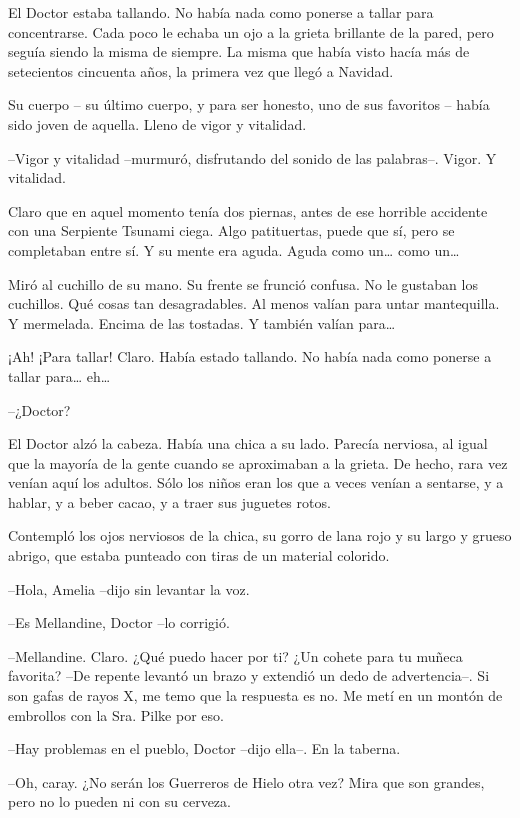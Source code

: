 El Doctor estaba tallando. No había nada como ponerse a tallar para concentrarse. Cada poco le echaba un ojo a la grieta brillante de la pared, pero seguía siendo la misma de siempre. La misma que había visto hacía más de setecientos cincuenta años, la primera vez que llegó a Navidad.

Su cuerpo – su último cuerpo, y para ser honesto, uno de sus favoritos – había sido joven de aquella. Lleno de vigor y vitalidad.

--Vigor y vitalidad --murmuró, disfrutando del sonido de las palabras--. Vigor. Y vitalidad.

Claro que en aquel momento tenía dos piernas, antes de ese horrible accidente con una Serpiente Tsunami ciega. Algo patituertas, puede que sí, pero se completaban entre sí. Y su mente era aguda. Aguda como un… como un…

Miró al cuchillo de su mano. Su frente se frunció confusa. No le gustaban los cuchillos. Qué cosas tan desagradables. Al menos valían para untar mantequilla. Y mermelada. Encima de las tostadas. Y también valían para…

¡Ah! ¡Para tallar! Claro. Había estado tallando. No había nada como ponerse a tallar para… eh…

--¿Doctor?

El Doctor alzó la cabeza. Había una chica a su lado. Parecía nerviosa, al igual que la mayoría de la gente cuando se aproximaban a la grieta. De hecho, rara vez venían aquí los adultos. Sólo los niños eran los que a veces venían a sentarse, y a hablar, y a beber cacao, y a traer sus juguetes rotos.

Contempló los ojos nerviosos de la chica, su gorro de lana rojo y su largo y grueso abrigo, que estaba punteado con tiras de un material colorido.

--Hola, Amelia --dijo sin levantar la voz.

--Es Mellandine, Doctor --lo corrigió.

--Mellandine. Claro. ¿Qué puedo hacer por ti? ¿Un cohete para tu muñeca favorita? --De repente levantó un brazo y extendió un dedo de advertencia--. Si son gafas de rayos X, me temo que la respuesta es no. Me metí en un montón de embrollos con la Sra. Pilke por eso.

--Hay problemas en el pueblo, Doctor --dijo ella--. En la taberna.

--Oh, caray. ¿No serán los Guerreros de Hielo otra vez? Mira que son grandes, pero no lo pueden ni con su cerveza.

